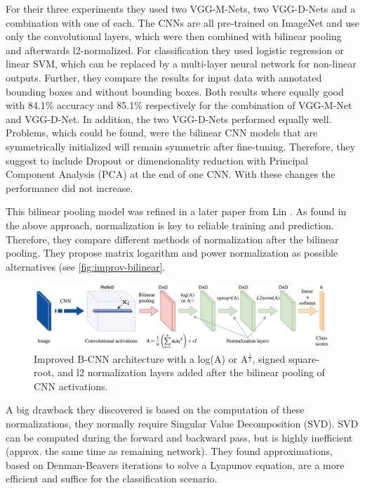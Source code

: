 \documentclass[electronic]{vgtc}             %
\begin{document}
	For their three experiments they used two VGG-M-Nets, two VGG-D-Nets and a combination with one of each. 
	The CNNs are all pre-trained on ImageNet and use only the convolutional layers, which were then combined with bilinear pooling and afterwards l2-normalized.
	For classification they used logistic regression or	linear SVM, which can be replaced by a multi-layer neural network for non-linear outputs.
	Further, they compare the results for input data with annotated bounding boxes and without bounding boxes. 
	Both results where equally good with 84.1\% accuracy and 85.1\% respectively for the combination of VGG-M-Net and VGG-D-Net. 
	In addition, the two VGG-D-Nets performed equally well.
	Problems, which could be found, were the bilinear CNN models that are symmetrically initialized will remain symmetric after fine-tuning. 
	Therefore, they suggest to include Dropout or dimensionality reduction with Principal Component Analysis (PCA) at the end of one CNN.
	With these changes the performance did not increase.
	
	This bilinear pooling model was refined in a later paper from Lin \cite{Lin:2017:Improv}. 
	As found in the above approach, normalization is key to reliable training and prediction. 
	Therefore, they compare different methods of normalization after the bilinear pooling. 
	They propose matrix logarithm and power normalization as possible alternatives (see \autoref{fig:improv-bilinear}.
	
	\begin{figure}[h]
		\includegraphics[width=.48\textwidth]{improv-bilinear}
		\caption{Improved B-CNN architecture with a log(A) or A$^\frac{1}{2}$, signed square-root, and l2 normalization layers added after the bilinear pooling of CNN activations.\cite{Lin:2017:Improv}}
		\label{fig:improv-bilinear}
	\end{figure}

	A big drawback they discovered is based on the computation of these normalizations, they normally require Singular Value Decomposition (SVD).
	SVD can be computed during the forward and backward pass, but is highly inefficient (approx. the same time as remaining network).
	They found approximations, based on Denman-Beavers iterations to solve a Lyapunov equation, are a more efficient and suffice for the classification scenario.
\end{document}
